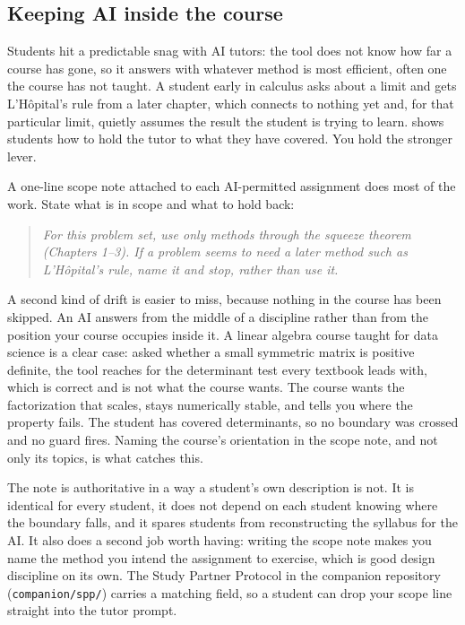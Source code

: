 \documentclass{SIAMbook2023}
\newcommand{\studentprompt}[1]{\begin{quote}\small\itshape #1\end{quote}}
\begin{document}
\subsection{Keeping AI inside the course}
\label{i:subsec:scope-note}%

Students hit a predictable snag with AI tutors: the tool does not know how far a course has gone, so it answers with whatever method is most efficient, often one the course has not taught. A student early in calculus asks about a limit and gets L'H\^{o}pital's rule from a later chapter, which connects to nothing yet and, for that particular limit, quietly assumes the result the student is trying to learn.  shows students how to hold the tutor to what they have covered. You hold the stronger lever.

A one-line scope note attached to each AI-permitted assignment does most of the work. State what is in scope and what to hold back:

\studentprompt{For this problem set, use only methods through the squeeze theorem (Chapters 1--3). If a problem seems to need a later method such as L'H\^{o}pital's rule, name it and stop, rather than use it.}

A second kind of drift is easier to miss, because nothing in the course has been skipped. An AI answers from the middle of a discipline rather than from the position your course occupies inside it. A linear algebra course taught for data science is a clear case: asked whether a small symmetric matrix is positive definite, the tool reaches for the determinant test every textbook leads with, which is correct and is not what the course wants. The course wants the factorization that scales, stays numerically stable, and tells you where the property fails. The student has covered determinants, so no boundary was crossed and no guard fires. Naming the course's orientation in the scope note, and not only its topics, is what catches this.

The note is authoritative in a way a student's own description is not. It is identical for every student, it does not depend on each student knowing where the boundary falls, and it spares students from reconstructing the syllabus for the AI. It also does a second job worth having: writing the scope note makes you name the method you intend the assignment to exercise, which is good design discipline on its own. The Study Partner Protocol in the companion repository (\texttt{companion/spp/}) carries a matching field, so a student can drop your scope line straight into the tutor prompt.
\end{document}
